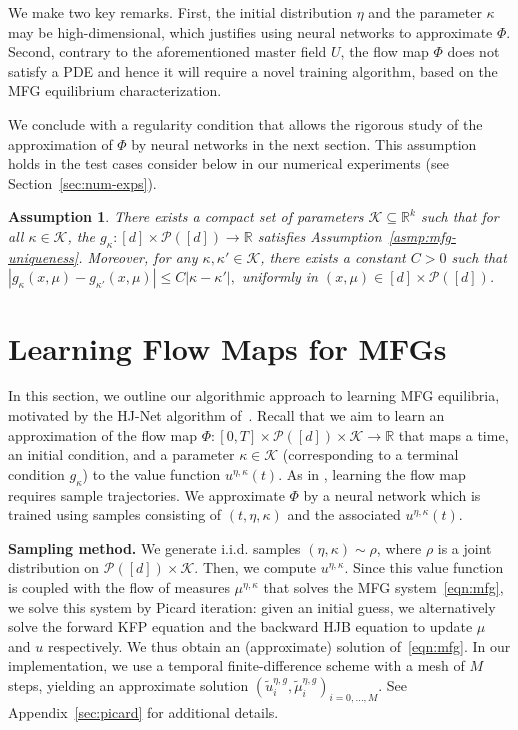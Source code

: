 \documentclass[11pt,reqno]{amsart}
\numberwithin{equation}{section}
\theoremstyle{plain}
\newtheorem{assumption}{Assumption}[section]
\newcommand{\R}{\mathbb{R}}
\newcommand{\calK}{{\mathcal K}}
\newcommand{\calP}{{\mathcal P}}
\newcommand{\1}{\boldsymbol{\mathbbm{1}}}
\begin{document}
We make two key remarks. First, the initial distribution $\eta$ and the parameter $\kappa$ may be high-dimensional, which justifies using neural networks to approximate $\Phi$. Second, contrary to the aforementioned master field $U$, the flow map $\Phi$ does not satisfy a PDE and hence it will require a novel training algorithm, based on the MFG equilibrium characterization. 

We conclude with a regularity condition that allows the rigorous study of the approximation of $\Phi$ by neural networks in the next section. This assumption holds in the test cases consider below in our numerical experiments (see Section~\ref{sec:num-exps}).
\begin{assumption}
\label{asmp:param-terminal-cost}
There exists a compact set of parameters $\calK \subseteq \R^k$ such that for all $\kappa \in \calK$, the $g_\kappa : [d] \times \calP([d]) \to \R$ satisfies Assumption~\ref{asmp:mfg-uniqueness}. Moreover, for any $\kappa, \kappa' \in \calK$, there exists a constant $C > 0$ such that
$
    |g_{\kappa}(x, \mu) - g_{\kappa'}(x, \mu)| \leq C|\kappa - \kappa'|,
$
uniformly in $(x, \mu) \in [d] \times \calP([d])$.
\end{assumption}

\section{Learning Flow Maps for MFGs}
\label{sec:method}
In this section, we outline our algorithmic approach to learning MFG equilibria, motivated by the HJ-Net algorithm of~\cite{Lanthaler2025}. Recall that we aim to learn an approximation of the flow map $\Phi : [0, T] \times \calP([d]) \times \calK \to \R$ that maps a time, an initial condition, and a parameter $\kappa \in \calK$ (corresponding to a terminal condition $g_\kappa$) to the value function $u^{\eta, \kappa}(t)$. As in \cite[Section 4]{Lanthaler2025}, learning the flow map requires sample trajectories. We approximate $\Phi$ by a neural network which is trained using samples consisting of $(t, \eta, \kappa)$ and the associated $u^{\eta, \kappa}(t)$.

\noindent\textbf{Sampling method.} 
We generate i.i.d. samples $(\eta, \kappa) \sim \rho$, where $\rho$ is a joint distribution on $\calP([d]) \times \calK$. Then, we compute $u^{\eta, \kappa}$. 
Since this value function is coupled with the flow of measures $\mu^{\eta,\kappa}$ that solves the MFG system~\eqref{eqn:mfg}, we solve this system by Picard iteration: given an initial guess, we alternatively solve the forward KFP equation and the backward HJB equation to update $\mu$ and $u$ respectively. We thus obtain an (approximate) solution of~\eqref{eqn:mfg}. In our implementation, we use a temporal finite-difference scheme with a mesh of $M$ steps, yielding an approximate solution $(\tilde{u}^{\eta,g}_i, \tilde{\mu}^{\eta,g}_i)_{i=0,\dots,M}$. See Appendix~\ref{sec:picard} for additional details.
\end{document}
